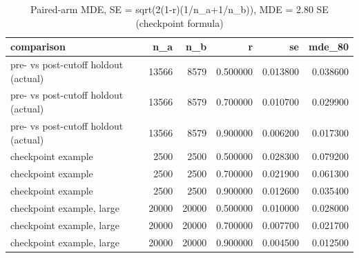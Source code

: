 \begin{table}
\caption{Paired-arm MDE, SE = sqrt(2(1-r)(1/n_a+1/n_b)), MDE = 2.80 SE (checkpoint formula)}
\label{tab:cd_mde_contamination}
\begin{tabular}{lrrrrr}
\toprule
comparison & n\_a & n\_b & r & se & mde\_80 \\
\midrule
pre- vs post-cutoff holdout (actual) & 13566 & 8579 & 0.500000 & 0.013800 & 0.038600 \\
pre- vs post-cutoff holdout (actual) & 13566 & 8579 & 0.700000 & 0.010700 & 0.029900 \\
pre- vs post-cutoff holdout (actual) & 13566 & 8579 & 0.900000 & 0.006200 & 0.017300 \\
checkpoint example & 2500 & 2500 & 0.500000 & 0.028300 & 0.079200 \\
checkpoint example & 2500 & 2500 & 0.700000 & 0.021900 & 0.061300 \\
checkpoint example & 2500 & 2500 & 0.900000 & 0.012600 & 0.035400 \\
checkpoint example, large & 20000 & 20000 & 0.500000 & 0.010000 & 0.028000 \\
checkpoint example, large & 20000 & 20000 & 0.700000 & 0.007700 & 0.021700 \\
checkpoint example, large & 20000 & 20000 & 0.900000 & 0.004500 & 0.012500 \\
\bottomrule
\end{tabular}
\end{table}
